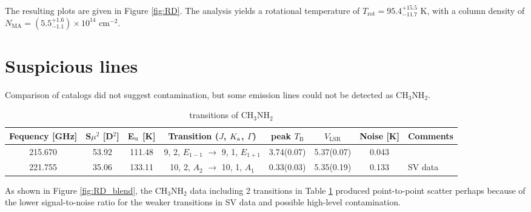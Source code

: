 The resulting plots are given in Figure \ref{fig:RD}.
The analysis yields a rotational temperature of $T_{\mathrm{rot}} =  95.4^{+15.5}_{-11.7} \,\,\mathrm{K}$, 
with a column density of $N_{\mathrm{MA}} = ( 5.5^{+1.6}_{-1.1} ) \times 10^{14} \,\,\mathrm{cm^{-2}}$.

\section{Suspicious lines}
Comparison of catalogs did not suggest contamination, but some emission lines could not be detected as CH$_{3}$NH$_{2}$.

\renewcommand{\arraystretch}{1.5}
\begin{table}[htb]
\begin{center}

  \caption{transitions of CH$_3$NH$_2$}
  \label{tab:unresolved}
{\scriptsize
  \begin{tabular}{cccccccl} \hline
   Fequency [GHz]& S$\mu ^{2}$ [D$^2$] & E$_{\rm{u}}$ [K]& Transition ($J$, $K_{\rm{a}}$, $\Gamma$) 
   & peak $T_{\mathrm{B}}$\footnotemark[1] [K] & $V_{\mathrm{LSR}}$\footnotemark[1] [km s$^{-1}$] & Noise [K]  &Comments \\ \hline 
    215.670 & 53.92 & 111.48 & 9, 2, $E_{1-1}$ $\rightarrow$ 9, 1, $E_{1+1}$  & 3.74(0.07) & 5.37(0.07) & 0.043 &  \\
    221.755 & 35.06 & 133.11 & 10, 2, $A_{2}$ $\rightarrow$ 10, 1, $A_{1}$ & 0.33(0.03)& 5.35(0.19) & 0.133 &SV data \\ \hline
  \end{tabular}
  }
\end{center}
\end{table}


As shown in Figure \ref{fig:RD_blend}, the CH$_{3}$NH$_{2}$ data including 2 transitions in Table \ref{tab:unresolved} 
produced point-to-point scatter perhaps because of the lower signal-to-noise ratio for the weaker transitions in SV data 
and possible high-level contamination.

